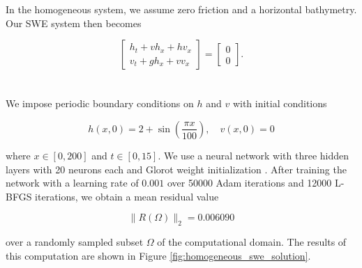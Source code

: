 In the homogeneous system, we assume zero friction and a horizontal bathymetry. Our SWE system then becomes

$$
\renewcommand*{\arraystretch}{1.5}\begin{bmatrix}
    
    h_t + v h_x + h v_x \\
    v_t + g h_x + v v_x
\end{bmatrix} = \begin{bmatrix}
    0 \\
    0
\end{bmatrix}.
$$
\ \\\\
\noindent We impose periodic boundary conditions on $h$ and $v$ with initial conditions

$$
h(x, 0) = 2 + \sin{\left( \frac{\pi x}{100} \right)}, \quad v(x, 0) = 0
$$

\noindent where $x \in [0, 200]$ and $t \in [0, 15]$. We use a neural network with three hidden layers with 20 neurons 
each and Glorot weight initialization \cite{glorot2010understanding}. After training the network with a learning rate of $0.001$
over 50000 Adam iterations and 12000 L-BFGS iterations, we obtain a mean residual value

$$
\lVert R(\Omega) \rVert_2 = 0.006090
$$

\pagebreak

\noindent over a randomly sampled subset $\Omega$ of the computational domain. The results of this computation are shown 
in Figure \ref{fig:homogeneous_swe_solution}.

